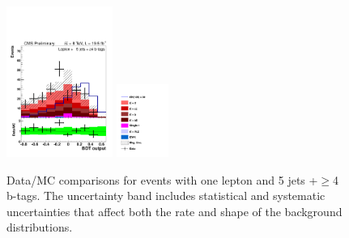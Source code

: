 \begin{figure}[hbtp]
\begin{center}
   \includegraphics[width=0.31\textwidth]{Figures/Analysis_2_Diagrams/LJ_plots_lep/5j4t/lep_disc_ttH_ttbb_5j4t_8TeV_CFMlpANN_BDT_5j4t_cumulative_wRatio_noLegend_lin.pdf}
   \includegraphics[width=0.15\textwidth]{Figures/Analysis_2_Diagrams/LJ_plots_lep/ttH_legend_1columns.pdf}
   \caption{Data/MC comparisons for events with one lepton and 5 jets +$\ge$4 b-tags.  The uncertainty band includes statistical and systematic uncertainties that affect both the rate and shape of the background distributions.}
   \label{fig:lj_input_II_5j4t_1}
 \end{center}
\end{figure}

\clearpage


